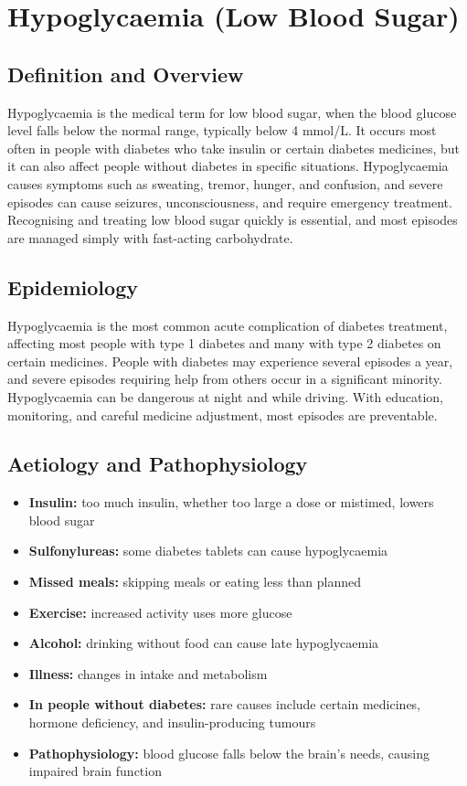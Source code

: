 \chapter{Hypoglycaemia (Low Blood Sugar)}

\section*{Definition and Overview}
Hypoglycaemia is the medical term for low blood sugar, when the blood glucose level falls below the normal range, typically below 4 mmol/L. It occurs most often in people with diabetes who take insulin or certain diabetes medicines, but it can also affect people without diabetes in specific situations. Hypoglycaemia causes symptoms such as sweating, tremor, hunger, and confusion, and severe episodes can cause seizures, unconsciousness, and require emergency treatment. Recognising and treating low blood sugar quickly is essential, and most episodes are managed simply with fast-acting carbohydrate.

\section*{Epidemiology}
Hypoglycaemia is the most common acute complication of diabetes treatment, affecting most people with type 1 diabetes and many with type 2 diabetes on certain medicines. People with diabetes may experience several episodes a year, and severe episodes requiring help from others occur in a significant minority. Hypoglycaemia can be dangerous at night and while driving. With education, monitoring, and careful medicine adjustment, most episodes are preventable.

\section*{Aetiology and Pathophysiology}
\begin{itemize}
    \item \textbf{Insulin:} too much insulin, whether too large a dose or mistimed, lowers blood sugar
    \item \textbf{Sulfonylureas:} some diabetes tablets can cause hypoglycaemia
    \item \textbf{Missed meals:} skipping meals or eating less than planned
    \item \textbf{Exercise:} increased activity uses more glucose
    \item \textbf{Alcohol:} drinking without food can cause late hypoglycaemia
    \item \textbf{Illness:} changes in intake and metabolism
    \item \textbf{In people without diabetes:} rare causes include certain medicines, hormone deficiency, and insulin-producing tumours
    \item \textbf{Pathophysiology:} blood glucose falls below the brain's needs, causing impaired brain function
\end{itemize}

